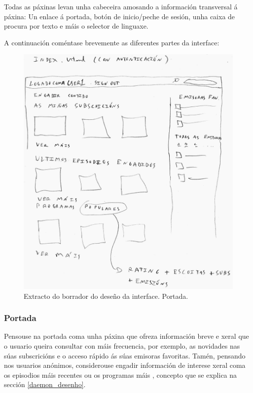 Todas as páxinas levan unha cabeceira amosando a información transversal á páxina: Un enlace á portada, botón de inicio/peche de sesión, unha caixa de procura por texto e máis o selector de linguaxe. 

A continuación coméntase brevemente as diferentes partes da interface:

\begin{figure}[H]
	\centering
	\includegraphics[scale=0.2,keepaspectratio=true]{./images/index1_p.png}
	\caption{Extracto do borrador do deseño da interface. Portada.}
	\label{fig:index1_p}
\end{figure}

\subsubsection{Portada}

Pensouse na portada coma unha páxina que ofreza información breve e xeral que o usuario queira consultar con máis frecuencia, por exemplo, as novidades nas súas subscricións e o acceso rápido ás súas emisoras favoritas. Tamén, pensando nos usuarios anónimos, considerouse engadir información de interese xeral coma os episodios máis recentes ou os programas máis , concepto que se explica na sección \ref{daemon_desenho}.

